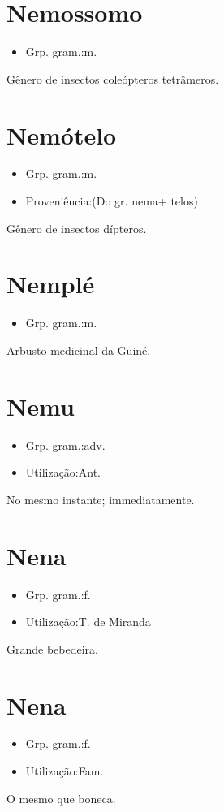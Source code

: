 \section{Nemossomo}
\begin{itemize}
\item {Grp. gram.:m.}
\end{itemize}
Gênero de insectos coleópteros tetrâmeros.
\section{Nemótelo}
\begin{itemize}
\item {Grp. gram.:m.}
\end{itemize}
\begin{itemize}
\item {Proveniência:(Do gr. \textunderscore nema\textunderscore  + \textunderscore telos\textunderscore )}
\end{itemize}
Gênero de insectos dípteros.
\section{Nemplé}
\begin{itemize}
\item {Grp. gram.:m.}
\end{itemize}
Arbusto medicinal da Guiné.
\section{Nemu}
\begin{itemize}
\item {Grp. gram.:adv.}
\end{itemize}
\begin{itemize}
\item {Utilização:Ant.}
\end{itemize}
No mesmo instante; immediatamente.
\section{Nena}
\begin{itemize}
\item {Grp. gram.:f.}
\end{itemize}
\begin{itemize}
\item {Utilização:T. de Miranda}
\end{itemize}
Grande bebedeira.
\section{Nena}
\begin{itemize}
\item {Grp. gram.:f.}
\end{itemize}
\begin{itemize}
\item {Utilização:Fam.}
\end{itemize}
O mesmo que \textunderscore boneca\textunderscore .
